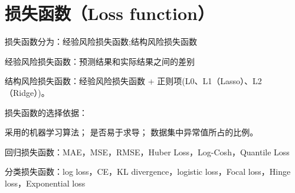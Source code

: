 

\section{损失函数（Loss function）}
\noindent 损失函数分为：经验风险损失函数;结构风险损失函数
\begin{outline}
\1经验风险损失函数：预测结果和实际结果之间的差别

\1 结构风险损失函数：经验风险损失函数 + 正则项(L0、L1（Lasso）、L2（Ridge）)。

\end{outline}

\noindent 损失函数的选择依据：
\begin{outline}
	\1 采用的机器学习算法；
	\1 是否易于求导；
	\1 数据集中异常值所占的比例。
\end{outline}


\noindent 回归损失函数：MAE，MSE，RMSE，Huber Loss，Log-Cosh，Quantile Loss

\noindent 分类损失函数：log loss，CE，KL divergence，logistic loss，Focal loss，Hinge loss，Exponential loss

